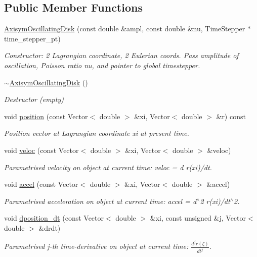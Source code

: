 \subsection*{Public Member Functions}
\begin{DoxyCompactItemize}
\item 
\hyperlink{classAxisymOscillatingDisk_a7671a9c1b8d4d854752ea14aa4f5865d}{Axisym\+Oscillating\+Disk} (const double \&ampl, const double \&nu, Time\+Stepper $\ast$time\+\_\+stepper\+\_\+pt)
\begin{DoxyCompactList}\small\item\em Constructor\+: 2 Lagrangian coordinate, 2 Eulerian coords. Pass amplitude of oscillation, Poisson ratio nu, and pointer to global timestepper. \end{DoxyCompactList}\item 
\hyperlink{classAxisymOscillatingDisk_ab79de13fa0dcfac5d04d6ff371241c5d}{$\sim$\+Axisym\+Oscillating\+Disk} ()
\begin{DoxyCompactList}\small\item\em Destructor (empty) \end{DoxyCompactList}\item 
void \hyperlink{classAxisymOscillatingDisk_ab63d762c8fecce8de5a2b7dc4b3b677a}{position} (const Vector$<$ double $>$ \&xi, Vector$<$ double $>$ \&r) const
\begin{DoxyCompactList}\small\item\em Position vector at Lagrangian coordinate xi at present time. \end{DoxyCompactList}\item 
void \hyperlink{classAxisymOscillatingDisk_a7b39985cb0658924472700f4383b53aa}{veloc} (const Vector$<$ double $>$ \&xi, Vector$<$ double $>$ \&veloc)
\begin{DoxyCompactList}\small\item\em Parametrised velocity on object at current time\+: veloc = d r(xi)/dt. \end{DoxyCompactList}\item 
void \hyperlink{classAxisymOscillatingDisk_a92993399b50f818c9045fe7cecf47fcb}{accel} (const Vector$<$ double $>$ \&xi, Vector$<$ double $>$ \&accel)
\begin{DoxyCompactList}\small\item\em Parametrised acceleration on object at current time\+: accel = d$^\wedge$2 r(xi)/dt$^\wedge$2. \end{DoxyCompactList}\item 
void \hyperlink{classAxisymOscillatingDisk_a47de8f45fc7006ccadb1300fefe54dfe}{dposition\+\_\+dt} (const Vector$<$ double $>$ \&xi, const unsigned \&j, Vector$<$ double $>$ \&drdt)
\begin{DoxyCompactList}\small\item\em Parametrised j-\/th time-\/derivative on object at current time\+: $ \frac{d^{j} r(\zeta)}{dt^j} $. \end{DoxyCompactList}\end{DoxyCompactItemize}
